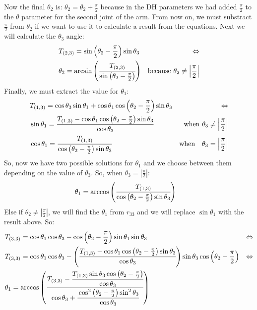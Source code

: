 Now the final $\theta_2$ is: $\theta_2 = \theta_2 + \frac{\pi}{2}$ because in the DH parameters we had added $\frac{\pi}{2}$ to the $\theta$ parameter for the second joint of the arm. From now on, we must substract $\frac{\pi}{2}$ from $\theta_2$ if we want to use it to calculate a result from the equations. Next we will calculate the $\theta_3$ angle:
\begin{align*}
&T_{(2,3)} = \sin\left(\theta_2 - \frac{\pi}{2}\right)\sin\theta_3 &\Leftrightarrow \\
& \theta_3 = \arcsin\left( \cfrac{ T_{(2,3)} }{ \sin\left(\theta_2-\frac{\pi}{2}\right)}\right)  &\text{because }    \theta_2 \neq \left|\frac{\pi}{2}\right|
\end{align*}
Finally, we must extract the value for $\theta_1$:
\begin{align*}
&T_{(1,3)} = \cos\theta_3\sin\theta_1 + \cos\theta_1\cos\left(\theta_2 - \frac{\pi}{2}\right)\sin\theta_3 &\Leftrightarrow \\
&\sin\theta_1 = \cfrac{T_{(1,3)} - \cos\theta_1\cos\left(\theta_2 - \frac{\pi}{2}\right)\sin\theta_3}{\cos\theta_3}  &\text{when } \theta_3 \neq \left|\frac{\pi}{2}\right|\\
&\cos\theta_1 = \cfrac{T_{(1,3)}}{\cos\left(\theta_2 - \frac{\pi}{2}\right)\sin\theta_3}  &\text{when} \quad \theta_3 = \left|\frac{\pi}{2}\right|
\end{align*}
So, now we have two possible solutions for $\theta_1$ and we choose between them depending on the value of $\theta_3$. So, when $\theta_3 = \left|\frac{\pi}{2}\right|$:
\begin{align*}
&\theta_1 = \arccos\left(\cfrac{T_{(1,3)}}{\cos\left(\theta_2 - \frac{\pi}{2}\right)\sin\theta_3}\right)
\end{align*}
Else if $\theta_2 \neq \left|\frac{\pi}{2}\right|$, we will find the $\theta_1$ from $r_{33}$ and we will replace $\sin\theta_1$ with the result above. So:
\begin{align*}
&T_{(3,3)} = \cos\theta_1\cos\theta_3 - \cos\left(\theta_2 - \frac{\pi}{2}\right)\sin\theta_1\sin\theta_3 &\Leftrightarrow \\
&T_{(3,3)} = \cos\theta_1\cos\theta_3 - \left(\cfrac{T_{(1,3)} - \cos\theta_1\cos\left(\theta_2 - \frac{\pi}{2}\right)\sin\theta_3}{\cos\theta_3}\right)\sin\theta_3\cos\left(\theta_2 - \frac{\pi}{2}\right) &\Leftrightarrow \\
&\theta_1 = \arccos\left(\cfrac{T_{(3,3)} -\cfrac{ T_{(1,3)}\sin\theta_3\cos\left(\theta_2 - \frac{\pi}{2}\right)}{\cos\theta_3}}{\cos\theta_3 + \cfrac{\cos^2\left(\theta_2-\frac{\pi}{2}\right)\sin^2\theta_3}{\cos\theta_3}}\right)
\end{align*}
